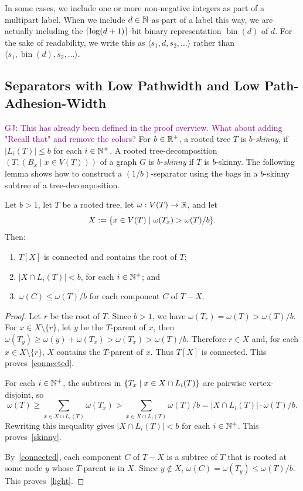 \documentclass{patmorin}
\renewcommand{\ge}{\geqslant}
\renewcommand{\le}{\leqslant}
\newcommand{\gwen}[1]{\noindent\textcolor{Purple}{GJ: #1}}
\newcommand{\defin}[1]{\emph{\textcolor{brightmaroon}{#1}}}
\DeclareMathOperator{\bin}{bin}
\DeclarePairedDelimiter{\set}{\{}{\}}
\DeclarePairedDelimiter{\ceil}{\lceil}{\rceil}
\begin{document}
  In some cases, we include one or more non-negative integers as part of a multipart label.  When we include $d\in\mathbb{N}$ as part of a label this way, we are actually including the $\ceil{\log(d+1)}$-bit binary representation \defin{$\bin(d)$} of $d$.  For the sake of readability, we write this as $\langle s_1,d,s_2,\ldots\rangle$ rather than $\langle s_1,\bin(d),s_2,\ldots\rangle$. \label{bin_d}

  \subsection{Separators with Low Pathwidth and Low Path-Adhesion-Width}

  \gwen{This has already been defined in the proof overview. What about adding "Recall that" and remove the colors?}
  For $b\in\mathbb{R}^+$,
  a rooted tree $T$ is \defin{$b$-skinny},
  if $|L_i(T)|\le b$ for each $i\in\mathbb{N}^+$.  A rooted tree-decomposition $(T,(B_x\mid x\in V(T)))$ of a graph $G$ is \defin{$b$-skinny} if $T$ is $b$-skinny.  The following lemma shows how to construct a $(1/b)$-separator using the bags in a $b$-skinny subtree of a tree-decomposition.


  \begin{lem}\label{low_pathwidth_separator}
    Let $b>1$, let $T$ be a rooted tree, let $\omega:V(T)\to\mathbb{R}$, and let
    \[
    X:=\set{x\in V(T)\mid\omega(T_x)>\omega(T)/b}.
    \]
    Then:
    \begin{enumerate}[nosep,nolistsep,label=(\alph*)]
      \item\label{connected} $T[X]$ is connected and contains the root of $T$;
      \item\label{skinny} $|X\cap L_i(T)|< b$, for each $i\in\mathbb{N}^+$; and
      \item\label{light} $\omega(C)\le \omega(T)/b$ for each component $C$ of $T-X$.
    \end{enumerate}
  \end{lem}

  \begin{proof}
    Let $r$ be the root of $T$.  Since $b>1$, we have $\omega(T_r)=\omega(T)>\omega(T)/b$. %
    For $x\in X\setminus\{r\}$, let $y$ be the $T$-parent of $x$, then
    $\omega(T_y)\ge \omega(y)+\omega(T_x)>\omega(T_x)>\omega(T)/b$.
    Therefore $r\in X$ and, for each $x\in X\setminus\{r\}$, $X$ contains the $T$-parent of $x$. Thus $T[X]$ is connected.
    This proves~\ref{connected}.

    For each $i\in\mathbb{N}^+$, the subtrees in $\set{T_x \mid x\in X\cap L_i(T)}$ are pairwise vertex-disjoint, so
    \[
    \omega(T) \ge \sum_{x\in X\cap L_i(T)} \omega(T_x)> \sum_{x\in X\cap L_i(T)}\omega(T)/b = |X\cap L_i(T)|\cdot\omega(T)/b.
    \]
    Rewriting this inequality gives $|X\cap L_i(T)|<b$ for each $i\in\mathbb{N}^+$.
    This proves~\ref{skinny}.

    By~\ref{connected}, each component $C$ of $T-X$ is a subtree of $T$ that is rooted at some node $y$ whose $T$-parent is in $X$.  Since  $y\not\in X$, $\omega(C)=\omega(T_y)\le \omega(T)/b$.
    This proves~\ref{light}.
  \end{proof}
\end{document}
